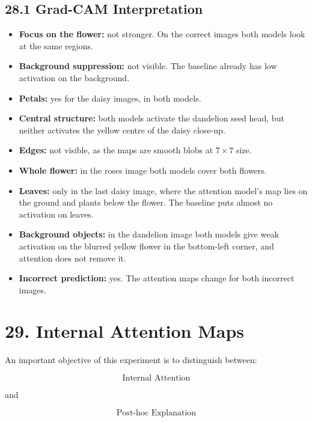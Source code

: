 \documentclass[10pt]{article}
\begin{document}
\subsection*{28.1 Grad-CAM Interpretation}

\begin{itemize}
\item \textbf{Focus on the flower:} not stronger. On the correct images both models look at the same regions.
\item \textbf{Background suppression:} not visible. The baseline already has low activation on the background.
\item \textbf{Petals:} yes for the daisy images, in both models.
\item \textbf{Central structure:} both models activate the dandelion seed head, but neither activates the yellow centre of the daisy close-up.
\item \textbf{Edges:} not visible, as the maps are smooth blobs at $7\times7$ size.
\item \textbf{Whole flower:} in the roses image both models cover both flowers.
\item \textbf{Leaves:} only in the last daisy image, where the attention model's map lies on the ground and plants below the flower. The baseline puts almost no activation on leaves.
\item \textbf{Background objects:} in the dandelion image both models give weak activation on the blurred yellow flower in the bottom-left corner, and attention does not remove it.
\item \textbf{Incorrect prediction:} yes. The attention maps change for both incorrect images.
\end{itemize}

\section*{29. Internal Attention Maps}

An important objective of this experiment is to distinguish between:

\[
\boxed{\text{Internal Attention}}
\]

and

\[
\boxed{\text{Post-hoc Explanation}}
\]
\end{document}
